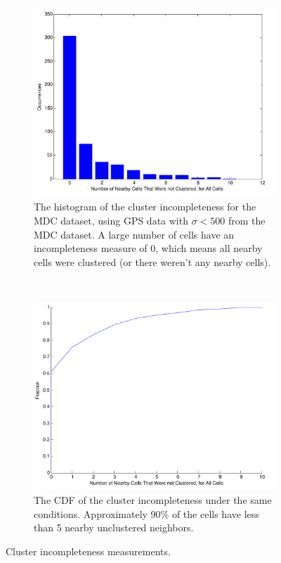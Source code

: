 \documentclass[letterpaper, 12pt, conference]{ieeeconf}
\begin{document}
\begin{figure}
        \centering
        \begin{subfigure}[t]{0.48\textwidth}
                \centering
                \includegraphics[width=\textwidth]{figs/cluster_incomp_hist}
                \caption{The histogram of the cluster incompleteness for the 
MDC dataset, using GPS data with $\sigma < 500$ from the MDC dataset. A large 
number of cells have an incompleteness measure of 0, which means all nearby 
cells were clustered (or there weren't any nearby cells).}
                \label{fig:cluster_incomp_hist}
        \end{subfigure}%
        ~ %
        \begin{subfigure}[t]{0.48\textwidth}
                \centering
                \includegraphics[width=\textwidth]{figs/cluster_incomp_cdf}
                \caption{The CDF of the cluster incompleteness under the same 
conditions. Approximately 90\% of the cells have less than 5 nearby 
unclustered neighbors.}
                \label{fig:cluster_incomp_cdf}
        \end{subfigure}
				\caption{Cluster incompleteness measurements.}
				\label{fig:cluster_incomp}
\end{figure}
\end{document}
